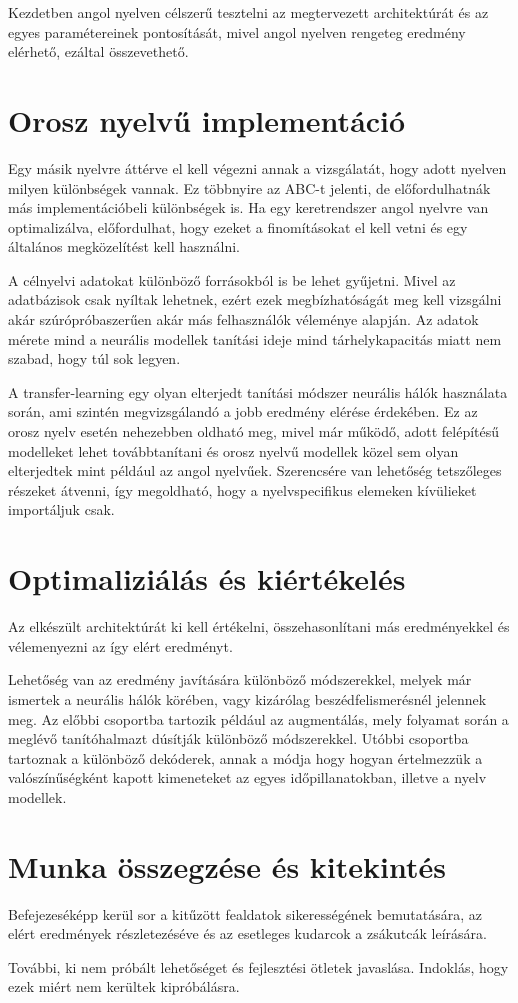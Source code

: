 Kezdetben angol nyelven célszerű tesztelni az megtervezett architektúrát és az egyes paramétereinek pontosítását, mivel angol nyelven rengeteg eredmény elérhető, ezáltal összevethető.

\section{Orosz nyelvű implementáció}

Egy másik nyelvre áttérve el kell végezni annak a vizsgálatát, hogy adott nyelven milyen különbségek vannak. Ez többnyire az ABC-t jelenti, de előfordulhatnák más implementációbeli különbségek is. Ha egy keretrendszer angol nyelvre van optimalizálva, előfordulhat, hogy ezeket a finomításokat el kell vetni és egy általános megközelítést kell használni.

A célnyelvi adatokat különböző forrásokból is be lehet gyűjetni. Mivel az adatbázisok csak nyíltak lehetnek, ezért ezek megbízhatóságát meg kell vizsgálni akár szúrópróbaszerűen akár más felhasználók véleménye alapján. Az adatok mérete mind a neurális modellek tanítási ideje mind tárhelykapacitás miatt nem szabad, hogy túl sok legyen.

A transfer-learning egy olyan elterjedt tanítási módszer neurális hálók használata során, ami szintén megvizsgálandó a jobb eredmény elérése érdekében. Ez az orosz nyelv esetén nehezebben oldható meg, mivel már működő, adott felépítésű modelleket lehet továbbtanítani és orosz nyelvű modellek közel sem olyan elterjedtek mint például az angol nyelvűek. Szerencsére van lehetőség tetszőleges részeket átvenni, így megoldható, hogy a nyelvspecifikus elemeken kívülieket importáljuk csak.

\section{Optimaliziálás és kiértékelés}

Az elkészült architektúrát ki kell értékelni, összehasonlítani más eredményekkel és vélemenyezni az így elért eredményt.

Lehetőség van az eredmény javítására különböző módszerekkel, melyek már ismertek a neurális hálók körében, vagy kizárólag beszédfelismerésnél jelennek meg. Az előbbi csoportba tartozik például az augmentálás, mely folyamat során a meglévő tanítóhalmazt dúsítják különböző módszerekkel. Utóbbi csoportba tartoznak a különböző dekóderek, annak a módja hogy hogyan értelmezzük a valószínűségként kapott kimeneteket az egyes időpillanatokban, illetve a nyelv modellek.

\section{Munka összegzése és kitekintés}

Befejezeséképp kerül sor a kitűzött fealdatok sikerességének bemutatására, az elért eredmények részletezéséve és az esetleges kudarcok a zsákutcák leírására.

További, ki nem próbált lehetőséget és fejlesztési ötletek javaslása. Indoklás, hogy ezek miért nem kerültek kipróbálásra.